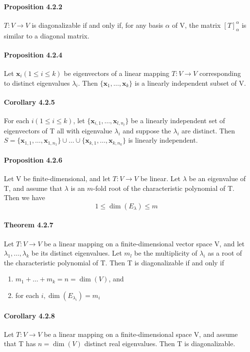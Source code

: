 \documentclass[11pt]{article}
\newcommand{\tb}[1]{\textbf{#1}}
\newcommand{\vx}[0]{\tb{x}}
\begin{document}
{\paragraph{Proposition 4.2.2} $T: V \rightarrow V$ is diagonalizable if and only if, for any basis $\alpha$ of V, the matrix $[T]_\alpha^\alpha$ is similar to a diagonal matrix.

\paragraph{Proposition 4.2.4} Let $\vx_i(1\leq i\leq k)$ be eigenvectors of a linear mapping $T: V \rightarrow V$ corresponding to distinct eigenvalues $\lambda_i$. Then $\{\vx_1,\hdots,\vx_k\}$ is a linearly independent subset of V.
\paragraph{Corollary 4.2.5} For each $i (1 \leq i \leq k)$, let $\{\vx_{i,1},\hdots,\vx_{l,n_l}\}$ be a linearly independent set of eigenvectors of T all with eigenvalue $\lambda_i$ and suppose the $\lambda_i$ are distinct. Then $S = \{ \vx_{1,1},\hdots,\vx_{1,n_1} \} \cup \hdots \cup \{ \vx_{k,1},\hdots,\vx_{k,n_k} \}$ is linearly independent.
\paragraph{Proposition 4.2.6} Let V be finite-dimensional, and let $T: V \rightarrow V$ be linear. Let $\lambda$ be an eigenvalue of T, and assume that $\lambda$ is an $m$-fold root of the characteristic polynomial of T. Then we have
	$$1\leq \dim(E_\lambda) \leq m$$
\paragraph{Theorem 4.2.7} Let $T: V \rightarrow V$ be a linear mapping on a finite-dimensional vector space V, and let $\lambda_1, \hdots, \lambda_k$ be its distinct eigenvalues. Let $m_l$ be the multiplicity of $\lambda_i$ as a root of the characteristic polynomial of T. Then T is diagonalizable if and only if 
	\begin{enumerate}
		\item $m_1 + \hdots + m_k = n = \dim(V)$, and
		\item for each $i, \dim(E_{\lambda_i}) = m_i$ 
	\end{enumerate}
\paragraph{Corollary 4.2.8} Let $T: V \rightarrow V$ be a linear mapping on a finite-dimensional space V, and assume that T has $n = \dim(V)$ distinct real eigenvalues. Then T is diagonalizable.
}
\end{document}
